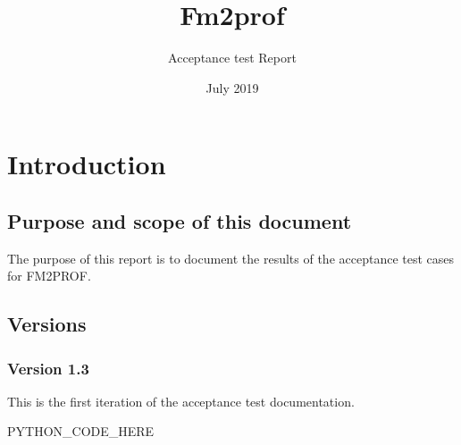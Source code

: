\documentclass[signature]{deltares_report}
\begin{document}
\pagestyle{empty}
\cleardoublepage
%

\newcommand{\ProgramName}{Fm2prof\xspace}

\title{\ProgramName}
\subtitle{Acceptance test Report}
\classification{-}

\date{July 2019}




\datei{\today}
\revieweri{}
\approvali{}

\disclaimer{}

\deltarestitle

\chapter{Introduction} 
\label{chapterIntroduction}

\section{Purpose and scope of this document} \label{sec:PurposeAndScope}
The purpose of this report is to document the results of the acceptance test cases for FM2PROF. 
\section{Versions}
\label{sec:Versions}


\subsection{Version 1.3}
\label{sec:Version}
This is the first iteration of the acceptance test documentation. 

PYTHON_CODE_HERE

\pagestyle{empty}
\mbox{}

\end{document}
